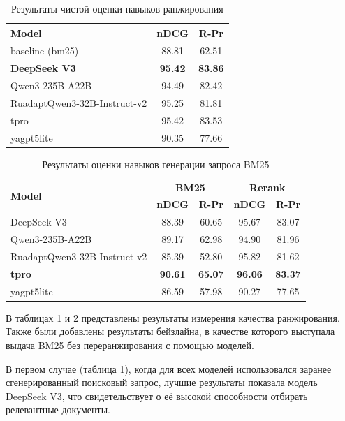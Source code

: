 \documentclass{article}
\theoremstyle{definition}
\theoremstyle{plain}
\begin{document}
\begin{table}[ht!]
\centering
\caption{Результаты чистой оценки навыков ранжирования}
\begin{tabular}{l|c|c}
\hline
\textbf{Model} & \textbf{nDCG} & \textbf{R‑Pr} \\
\hline
baseline (bm25)     & 88.81 & 62.51 \\
\hline
\textbf{DeepSeek V3}         & \textbf{95.42} & \textbf{83.86} \\
Qwen3-235B-A22B              & 94.49 & 82.42 \\
RuadaptQwen3-32B-Instruct-v2 & 95.25 & 81.81 \\
tpro                         & 95.42 & 83.53 \\
yagpt5lite                   & 90.35 & 77.66 \\
\hline
\end{tabular}
\label{tab:query_ref}
\end{table}

\begin{table}[ht]
\centering
\caption{Результаты оценки навыков генерации запроса BM25}
\begin{tabular}{l|cc|cc}
\hline
\multirow{2}{*}{\textbf{Model}} & \multicolumn{2}{c|}{\textbf{BM25}} & \multicolumn{2}{c}{\textbf{Rerank}} \\
 & \textbf{nDCG} & \textbf{R-Pr} & \textbf{nDCG} & \textbf{R-Pr} \\
\hline
DeepSeek V3                    &  88.39 & 60.65 & 95.67 & 83.07 \\
Qwen3-235B-A22B                & 89.17 & 62.98 & 94.90 & 81.96 \\
RuadaptQwen3-32B-Instruct-v2   & 85.39 & 52.80 & 95.82 & 81.62 \\
\textbf{tpro}                  & \textbf{90.61} & \textbf{65.07} & \textbf{96.06} & \textbf{83.37} \\
yagpt5lite                     & 86.59 & 57.98 & 90.27 & 77.65 \\
\hline
\end{tabular}
\label{tab:query_def}
\end{table}

В таблицах \ref{tab:query_ref} и \ref{tab:query_def} представлены результаты измерения качества ранжирования. 
Также были добавлены результаты бейзлайна, в качестве которого выступала выдача BM25 без переранжирования с помощью моделей. 

В первом случае (таблица \ref{tab:query_ref}), когда для всех моделей использовался заранее сгенерированный поисковый запрос, 
лучшие результаты показала модель DeepSeek V3, что свидетельствует о её высокой способности отбирать релевантные документы.
\end{document}
